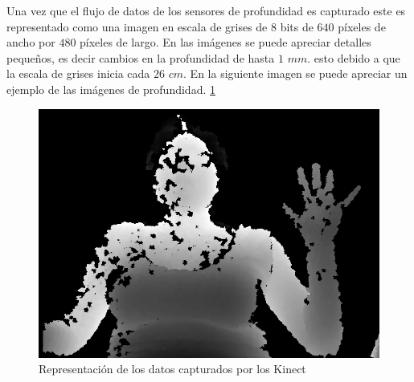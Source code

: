 Una vez que el flujo de datos de los sensores de profundidad es capturado este es representado como una imagen en escala de grises de $8$ bits de $640$ p\'ixeles de ancho por $480$ p\'ixeles de largo. En las imágenes se puede apreciar detalles pequeños, es decir cambios en la profundidad de hasta $1$  $mm.$ esto debido a que la escala de grises inicia cada $26$  $cm$. 
En la siguiente imagen se puede apreciar un ejemplo de las imágenes de profundidad. \ref{fig:ImagenCapturada}

\begin{figure}[h!]
\begin{center}
\includegraphics[scale=.5]{./Figures/166.png}
\end{center}
\caption{Representación de los datos capturados por los Kinect}
\label{fig:ImagenCapturada}
\end{figure}  

